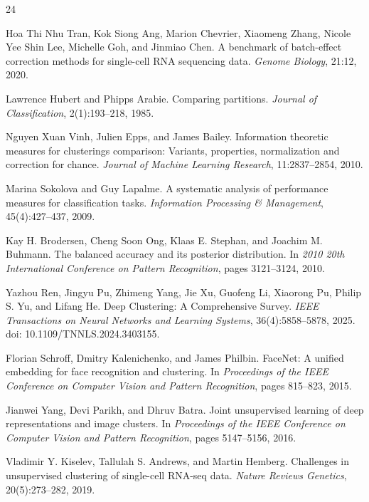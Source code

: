\documentclass[11pt,a4paper]{article}
\begin{document}
\begingroup
\small
\begin{thebibliography}{24}

Hoa Thi Nhu Tran, Kok Siong Ang, Marion Chevrier, Xiaomeng Zhang, Nicole Yee Shin Lee, Michelle Goh, and Jinmiao Chen.
\newblock A benchmark of batch-effect correction methods for single-cell RNA sequencing data.
\newblock \textit{Genome Biology}, 21:12, 2020.

Lawrence Hubert and Phipps Arabie.
\newblock Comparing partitions.
\newblock \textit{Journal of Classification}, 2(1):193--218, 1985.

Nguyen Xuan Vinh, Julien Epps, and James Bailey.
\newblock Information theoretic measures for clusterings comparison: Variants, properties, normalization and correction for chance.
\newblock \textit{Journal of Machine Learning Research}, 11:2837--2854, 2010.

Marina Sokolova and Guy Lapalme.
\newblock A systematic analysis of performance measures for classification tasks.
\newblock \textit{Information Processing \& Management}, 45(4):427--437, 2009.

Kay H. Brodersen, Cheng Soon Ong, Klaas E. Stephan, and Joachim M. Buhmann.
\newblock The balanced accuracy and its posterior distribution.
\newblock In \textit{2010 20th International Conference on Pattern Recognition}, pages 3121--3124, 2010.

Yazhou Ren, Jingyu Pu, Zhimeng Yang, Jie Xu, Guofeng Li, Xiaorong Pu, Philip S. Yu, and Lifang He.
\newblock Deep Clustering: A Comprehensive Survey.
\newblock \textit{IEEE Transactions on Neural Networks and Learning Systems}, 36(4):5858--5878, 2025.
\newblock doi: 10.1109/TNNLS.2024.3403155.

Florian Schroff, Dmitry Kalenichenko, and James Philbin.
\newblock FaceNet: A unified embedding for face recognition and clustering.
\newblock In \textit{Proceedings of the IEEE Conference on Computer Vision and Pattern Recognition}, pages 815--823, 2015.

Jianwei Yang, Devi Parikh, and Dhruv Batra.
\newblock Joint unsupervised learning of deep representations and image clusters.
\newblock In \textit{Proceedings of the IEEE Conference on Computer Vision and Pattern Recognition}, pages 5147--5156, 2016.

Vladimir Y. Kiselev, Tallulah S. Andrews, and Martin Hemberg.
\newblock Challenges in unsupervised clustering of single-cell RNA-seq data.
\newblock \textit{Nature Reviews Genetics}, 20(5):273--282, 2019.


\end{thebibliography}
\end{document}

